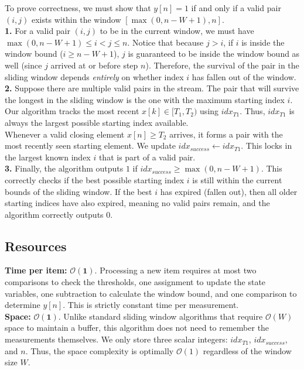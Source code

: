 \documentclass[11pt]{article}
\begin{document}
To prove correctness, we must show that $y[n]=1$ if and only if a valid pair $(i, j)$ exists within the window $[\max(0, n-W+1), n]$.\\
\textbf{1.} For a valid pair $(i, j)$ to be in the current window, we must have $\max(0, n-W+1) \le i < j \le n$. Notice that because $j > i$, if $i$ is inside the window bound ($i \ge n-W+1$), $j$ is guaranteed to be inside the window bound as well (since $j$ arrived at or before step $n$). Therefore, the survival of the pair in the sliding window depends \textit{entirely} on whether index $i$ has fallen out of the window.\\
\textbf{2.} Suppose there are multiple valid pairs in the stream. The pair that will survive the longest in the sliding window is the one with the maximum starting index $i$. \\
Our algorithm tracks the most recent $x[k] \in [T_1, T_2)$ using $\textit{idx}_{T1}$. Thus, $\textit{idx}_{T1}$ is always the largest possible starting index available.\\
Whenever a valid closing element $x[n] \ge T_2$ arrives, it forms a pair with the most recently seen starting element. We update $\textit{idx}_{success} \gets \textit{idx}_{T1}$. This locks in the largest known index $i$ that is part of a valid pair.\\
\textbf{3.} Finally, the algorithm outputs $1$ if $\textit{idx}_{success} \ge \max(0, n - W + 1)$. This correctly checks if the best possible starting index $i$ is still within the current bounds of the sliding window. If the best $i$ has expired (fallen out), then all older starting indices have also expired, meaning no valid pairs remain, and the algorithm correctly outputs $0$.

\subsection*{Resources}

\textbf{Time per item:} $\mathbf{\mathcal{O}(1)}$. Processing a new item requires at most two comparisons to check the thresholds, one assignment to update the state variables, one subtraction to calculate the window bound, and one comparison to determine $y[n]$. This is strictly constant time per measurement.\\
\textbf{Space:} $\mathbf{\mathcal{O}(1)}$. Unlike standard sliding window algorithms that require $\mathcal{O}(W)$ space to maintain a buffer, this algorithm does not need to remember the measurements themselves. We only store three scalar integers: $\textit{idx}_{T1}$, $\textit{idx}_{success}$, and $n$. Thus, the space complexity is optimally $\mathcal{O}(1)$ regardless of the window size $W$.\\
\end{document}
